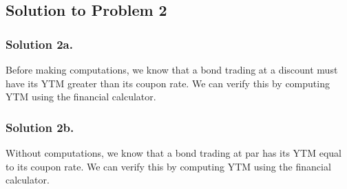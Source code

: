 \documentclass[12]{article}
\begin{document}
\color{blue}
\subsection*{Solution to Problem 2}
\subsubsection*{Solution 2a.}
Before making computations, we know that a bond trading at a discount must have its YTM greater than its coupon rate. We can verify this by computing YTM using the financial calculator.
\begin{table}[H]
    \centering
    \label{tab:my_label}
\end{table}


\subsubsection*{Solution 2b.}
Without computations, we know that a bond trading at par has its YTM equal to its coupon rate. We can verify this by computing YTM using the financial calculator.
\begin{table}[H]
    \centering
    \label{tab:my_label}
\end{table}
\end{document}
